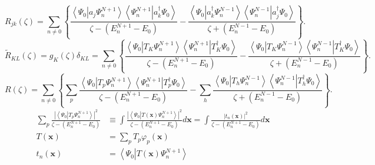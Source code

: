 \documentclass[aps,preprint]{revtex4}%
\begin{document}
\begin{equation}
R_{jk}\left(  \zeta\right)  =\sum_{n\neq0}\left\{  \frac{\left\langle \Psi
_{0}\left\vert a_{j}\Psi_{n}^{N+1}\right.  \right\rangle \left\langle \Psi
_{n}^{N+1}\left\vert a_{k}^{\dagger}\Psi_{0}\right.  \right\rangle }%
{\zeta-\left(  E_{n}^{N+1}-E_{0}\right)  }-\frac{\left\langle \Psi
_{0}\left\vert a_{k}^{\dagger}\Psi_{n}^{N-1}\right.  \right\rangle
\left\langle \Psi_{n}^{N-1}\left\vert a_{j}^{\dagger}\Psi_{0}\right.
\right\rangle }{\zeta+\left(  E_{n}^{N-1}-E_{0}\right)  }\right\}  .
\end{equation}%
\begin{equation}
\tilde{R}_{KL}\left(  \zeta\right)  =g_{K}\left(  \zeta\right)  \delta
_{KL}=\sum_{n\neq0}\left\{  \frac{\left\langle \Psi_{0}\left\vert T_{K}%
\Psi_{n}^{N+1}\right.  \right\rangle \left\langle \Psi_{n}^{N+1}\left\vert
T_{K}^{\dagger}\Psi_{0}\right.  \right\rangle }{\zeta-\left(  E_{n}%
^{N+1}-E_{0}\right)  }-\frac{\left\langle \Psi_{0}\left\vert T_{K}\Psi
_{n}^{N-1}\right.  \right\rangle \left\langle \Psi_{n}^{N-1}\left\vert
T_{K}^{\dagger}\Psi_{0}\right.  \right\rangle }{\zeta+\left(  E_{n}%
^{N-1}-E_{0}\right)  }\right\}  .
\end{equation}%
\begin{equation}
R\left(  \zeta\right)  =\sum_{n\neq0}\left\{  \sum_{p}\frac{\left\langle
\Psi_{0}\left\vert T_{p}\Psi_{n}^{N+1}\right.  \right\rangle \left\langle
\Psi_{n}^{N+1}\left\vert T_{p}^{\dagger}\Psi_{0}\right.  \right\rangle }%
{\zeta-\left(  E_{n}^{N+1}-E_{0}\right)  }-\sum_{h}\frac{\left\langle \Psi
_{0}\left\vert T_{h}\Psi_{n}^{N-1}\right.  \right\rangle \left\langle \Psi
_{n}^{N-1}\left\vert T_{h}^{\dagger}\Psi_{0}\right.  \right\rangle }%
{\zeta+\left(  E_{n}^{N-1}-E_{0}\right)  }\right\}  .
\end{equation}%
\begin{align}
\sum_{p}\frac{\left\vert \left\langle \Psi_{0}\left\vert T_{p}\Psi_{n}%
^{N+1}\right.  \right\rangle \right\vert ^{2}}{\zeta-\left(  E_{n}^{N+1}%
-E_{0}\right)  }  & \equiv\int\frac{\left\vert \left\langle \Psi_{0}\left\vert
T\left(  \mathbf{x}\right)  \Psi_{n}^{N+1}\right.  \right\rangle \right\vert
^{2}}{\zeta-\left(  E_{n}^{N+1}-E_{0}\right)  }d\mathbf{x=}\int\frac
{\left\vert t_{n}\left(  \mathbf{x}\right)  \right\vert ^{2}}{\zeta-\left(
E_{n}^{N+1}-E_{0}\right)  }d\mathbf{x}\\
T\left(  \mathbf{x}\right)    & =\sum_{p}T_{p}\varphi_{p}\left(
\mathbf{x}\right)  \\
t_{n}\left(  \mathbf{x}\right)    & =\left\langle \Psi_{0}\left\vert T\left(
\mathbf{x}\right)  \Psi_{n}^{N+1}\right.  \right\rangle
\end{align}
\end{document}

